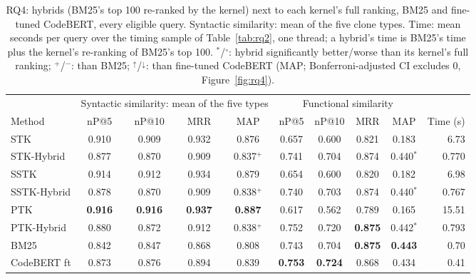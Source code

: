 \begin{table}[!htbp]
\centering
\caption{RQ4: hybrids (BM25's top 100 re-ranked by the kernel) next to each kernel's full ranking, BM25 and fine-tuned CodeBERT, every eligible query. Syntactic similarity: mean of the five clone types. Time: mean seconds per query over the timing sample of Table~\ref{tab:rq2}, one thread; a hybrid's time is BM25's time plus the kernel's re-ranking of BM25's top 100. $^{\ast}$/$^{\circ}$: hybrid significantly better/worse than its kernel's full ranking; $^{+}$/$^{-}$: than BM25; $^{\uparrow}$/$^{\downarrow}$: than fine-tuned CodeBERT (MAP; Bonferroni-adjusted CI excludes 0, Figure~\ref{fig:rq4}).}
\label{tab:rq4}
\footnotesize
\setlength{\tabcolsep}{3.5pt}
\begin{tabular}{lcccccccc||r}
\toprule
 & \multicolumn{4}{c}{Syntactic similarity: mean of the five types} & \multicolumn{4}{c}{Functional similarity} & \\
\cmidrule(lr){2-5}\cmidrule(lr){6-9}
Method & nP@5 & nP@10 & MRR & MAP & nP@5 & nP@10 & MRR & MAP & Time (s) \\
\midrule
STK & 0.910 & 0.909 & 0.932 & 0.876 & 0.657 & 0.600 & 0.821 & 0.183 & 6.73 \\
STK-Hybrid & 0.877 & 0.870 & 0.909 & 0.837$^{+}$ & 0.741 & 0.704 & 0.874 & 0.440$^{\ast}$ & 0.770 \\
\midrule
SSTK & 0.914 & 0.912 & 0.934 & 0.879 & 0.654 & 0.600 & 0.820 & 0.182 & 6.98 \\
SSTK-Hybrid & 0.878 & 0.870 & 0.909 & 0.838$^{+}$ & 0.740 & 0.703 & 0.874 & 0.440$^{\ast}$ & 0.767 \\
\midrule
PTK & \textbf{0.916} & \textbf{0.916} & \textbf{0.937} & \textbf{0.887} & 0.617 & 0.562 & 0.789 & 0.165 & 15.51 \\
PTK-Hybrid & 0.880 & 0.872 & 0.912 & 0.838$^{+}$ & 0.752 & 0.720 & \textbf{0.875} & 0.442$^{\ast}$ & 0.793 \\
\midrule
BM25 & 0.842 & 0.847 & 0.868 & 0.808 & 0.743 & 0.704 & \textbf{0.875} & \textbf{0.443} & 0.70 \\
CodeBERT ft & 0.873 & 0.876 & 0.894 & 0.839 & \textbf{0.753} & \textbf{0.724} & 0.868 & 0.434 & 0.41 \\
\bottomrule
\end{tabular}
\end{table}
